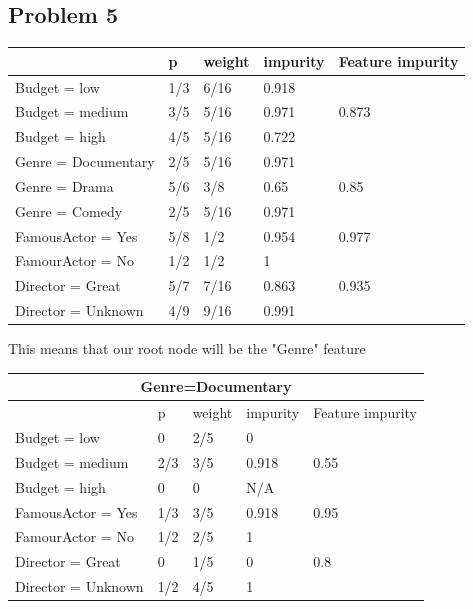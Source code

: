 \documentclass[letter]{article}
\theoremstyle{case}
\begin{document}
\subsection*{Problem 5}
\begin{table}[!h]
\begin{tabular}{|l|l|l|l|l|}
\hline
                    & p   & weight & impurity & Feature impurity \\ \hline
Budget = low        & 1/3 & 6/16   & 0.918    &                  \\ \cline{1-4}
Budget = medium     & 3/5 & 5/16   & 0.971    & 0.873            \\ \cline{1-4}
Budget = high       & 4/5 & 5/16   & 0.722    &                  \\ \hline
Genre = Documentary & 2/5 & 5/16   & 0.971    &                  \\ \cline{1-4}
Genre = Drama       & 5/6 & 3/8    & 0.65     & 0.85             \\ \cline{1-4}
Genre = Comedy      & 2/5 & 5/16   & 0.971    &                  \\ \hline
FamousActor = Yes   & 5/8 & 1/2    & 0.954    & 0.977            \\ \cline{1-4}
FamourActor = No    & 1/2 & 1/2    & 1        &                  \\ \hline
Director = Great    & 5/7 & 7/16   & 0.863    & 0.935            \\ \cline{1-4}
Director = Unknown  & 4/9 & 9/16   & 0.991    &                  \\ \hline
\end{tabular}
\end{table}
This means that our root node will be the "Genre" feature \\
\begin{table}[!h]
\begin{tabular}{|l|l|l|l|l|}
\hline
\multicolumn{5}{|c|}{Genre=Documentary}                         \\ \hline
                   & p   & weight & impurity & Feature impurity \\ \hline
Budget = low       & 0   & 2/5    & 0        &                  \\ \cline{1-4}
Budget = medium    & 2/3 & 3/5    & 0.918    & 0.55             \\ \cline{1-4}
Budget = high      & 0   & 0      & N/A      &                  \\ \hline
FamousActor = Yes  & 1/3 & 3/5    & 0.918    & 0.95             \\ \cline{1-4}
FamourActor = No   & 1/2 & 2/5    & 1        &                  \\ \hline
Director = Great   & 0   & 1/5    & 0        & 0.8              \\ \cline{1-4}
Director = Unknown & 1/2 & 4/5    & 1        &                  \\ \hline
\end{tabular}
\end{table} \\
\end{document}
